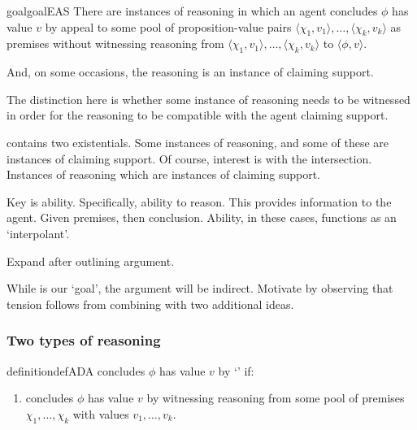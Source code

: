 \begin{note}
  \begin{restatable}{goal}{goalEAS}
    \label{prop:EAS}
    There are instances of reasoning in which an agent concludes \(\phi\) has value \(v\) by appeal to some pool of proposition-value pairs \(\langle \chi_{1},v_{1} \rangle,\dots,\langle \chi_{k},v_{k} \rangle\) as premises without witnessing reasoning from \(\langle \chi_{1},v_{1} \rangle,\dots,\langle \chi_{k},v_{k} \rangle\) to \(\langle \phi,v \rangle\).

    And, on some occasions, the reasoning is an instance of claiming support.
  \end{restatable}
\end{note}

\begin{note}
  The distinction here is whether some instance of reasoning needs to be witnessed in order for the reasoning to be compatible with the agent claiming support.

  \EAS{} contains two existentials.
  Some instances of reasoning, and some of these are instances of claiming support.
  Of course, interest is with the intersection.
  Instances of reasoning which are instances of claiming support.

  Key is ability.
  Specifically, ability to reason.
  This provides information to the agent.
  Given premises, then conclusion.
  Ability, in these cases, functions as an `interpolant'.

  Expand after outlining argument.
\end{note}

\begin{note}
  While \EAS{} is our `goal', the argument will be indirect.
  Motivate \EAS{} by observing that tension follows from combining \USE{} with two additional ideas.
\end{note}

\subsubsection{Two types of reasoning}
\label{sec:two-types-reasoning}

\begin{note}
  \begin{restatable}[\adA{}]{definition}{defADA}
    \label{AR:adA}
    \label{def:adA}
    \vAgent{} concludes \(\phi\) has value \(v\) by `\adA{}' if:
    \begin{enumerate}[label=\textsf{S:\arabic*}., ref=(\textsf{S}:\arabic*)]%
    \item
      \label{def:adA:psi}
      \vAgent{} concludes \(\phi\) has value \(v\) by witnessing reasoning from some  pool of premises \(\chi_{1},\dots,\chi_{k}\) with values \(v_{1},\dots,v_{k}\).
    \end{enumerate}
    \vspace{-\baselineskip}
  \end{restatable}
\end{note}

